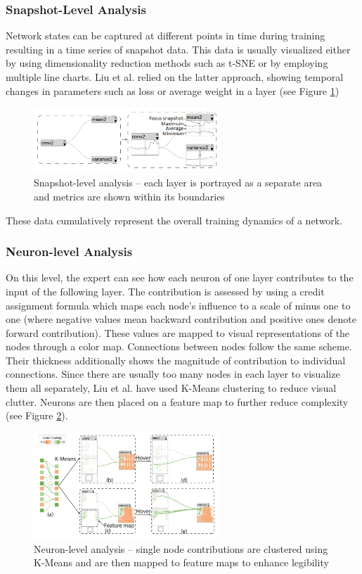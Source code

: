 \documentclass{acmsiggraph}               %
\begin{document}
\subsubsection{Snapshot-Level Analysis}
Network states can be captured at different points in time during training resulting in a time series of snapshot data.
This data is usually visualized either by using dimensionality reduction methods such as t-SNE or by employing multiple line charts. 
Liu et al. relied on the latter approach, showing temporal changes in parameters such as loss or average weight in a layer (see Figure \ref{fig:mengchen2})

\begin{figure}[!htb]
  \centering
  \includegraphics[width=2.75in]{mengchen2}
  \caption{Snapshot-level analysis -- each layer is portrayed as a separate area and metrics are shown within its boundaries \protect\cite{Liu2018}}
  \label{fig:mengchen2}
\end{figure}

These data cumulatively represent the overall training dynamics of a network.

\subsubsection{Neuron-level Analysis}
On this level, the expert can see how each neuron of one layer contributes to the input of the following layer. The contribution is assessed by using a credit assignment formula which maps each node's influence to a scale of minus one to one (where negative values mean backward contribution and positive ones denote forward contribution).
These values are mapped to visual representations of the nodes through a color map. Connections between nodes follow the same scheme. Their thickness additionally shows the magnitude of contribution to individual connections. Since there are usually too many nodes in each layer to visualize them all separately, Liu et al. have used K-Means clustering to reduce visual clutter. Neurons are then placed on a feature map to further reduce complexity (see Figure \ref{fig:mengchen3}).

\begin{figure}[!htb]
  \centering
  \includegraphics[width=2.75in]{mengchen3}
  \caption{Neuron-level analysis -- single node contributions are clustered using K-Means and are then mapped to feature maps to enhance legibility \protect\cite{Liu2018}}
  \label{fig:mengchen3}
\end{figure}
\end{document}
